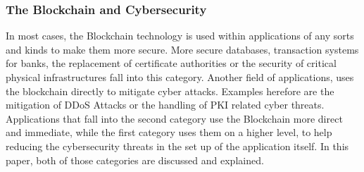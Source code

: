 \subsubsection{The Blockchain and Cybersecurity}
In most cases, the Blockchain technology is used within applications of any sorts and kinds to make them more secure. More secure databases, transaction systems for banks, the replacement of certificate authorities or the security of critical physical infrastructures fall into this category. Another field of applications, uses the blockchain directly to mitigate cyber attacks. Examples herefore are the mitigation of DDoS Attacks or the handling of PKI related cyber threats. Applications that fall into the second category use the Blockchain more direct and immediate, while the first category uses them on a higher level, to help reducing the cybersecurity threats in the set up of the application itself.
In this paper, both of those categories are discussed and explained.
